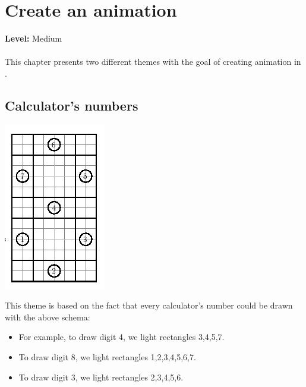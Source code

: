 \chapter{Create an animation}
{ }\hfill\textbf{Level:} Medium\\ \\
This chapter presents two different themes with the goal of creating animation in \xlogo.
\section{Calculator's numbers}
\begin{center}
\includegraphics{pics/animation-chiffre.png}
\end{center}
\noindent This theme is based on the fact that every calculator's number could be drawn with the above schema:
\begin{itemize}
\item For example, to draw digit 4, we light rectangles 3,4,5,7.
\item To draw digit 8, we light rectangles 1,2,3,4,5,6,7.
\item To draw digit 3, we light rectangles 2,3,4,5,6.
\end{itemize}

